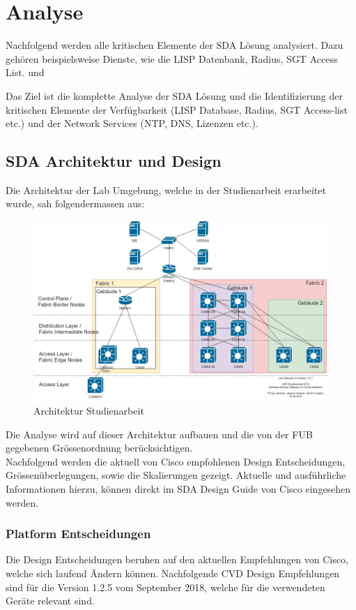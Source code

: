 \section{Analyse}
Nachfolgend werden alle kritischen Elemente der SDA Lösung analysiert. Dazu gehören beispielsweise Dienste, wie die LISP Datenbank, Radius, SGT Access List. und 

Das Ziel ist die komplette Analyse der SDA Lösung und die Identifizierung der kritischen Elemente der Verfügbarkeit (LISP Database, Radius, SGT Access-list etc.) und der Network Services (NTP, DNS, Lizenzen etc.).

\subsection{SDA Architektur und Design}
Die Architektur der Lab Umgebung, welche in der Studienarbeit erarbeitet wurde, sah folgendermassen aus:

\begin{figure}[H]
	\centering
	\includegraphics[width=1\linewidth]{img/Architecture/LabNetworkArchitecture_SA}
	\caption{Architektur Studienarbeit}
	\label{fig:Architektur Studienarbeit}
\end{figure}

Die Analyse wird auf dieser Architektur aufbauen und die von der FUB gegebenen Grössenordnung berücksichtigen. \\

Nachfolgend werden die aktuell von Cisco empfohlenen Design Entscheidungen, Grössen\-über\-legungen, sowie die Skalierungen gezeigt. Aktuelle und ausführliche Informationen hierzu, können direkt im SDA Design Guide von Cisco \cite{sda-designguide-sept2018} eingesehen werden. 

\subsubsection{Platform Entscheidungen}
Die Design Entscheidungen beruhen auf den aktuellen Empfehlungen von Cisco, welche sich laufend Ändern können. Nachfolgende CVD Design Empfehlungen sind für die Version 1.2.5 vom September 2018, welche für die verwendeten Geräte relevant sind. 

